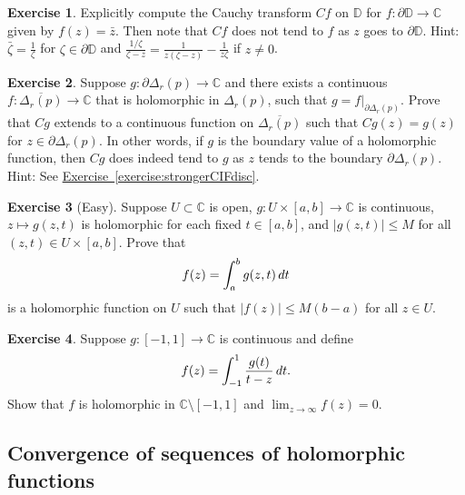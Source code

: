 \documentclass[12pt,openany]{book}
\newcommand{\avoidbreak}{\postdisplaypenalty=100}
\newcommand{\sabs}[1]{\lvert {#1} \rvert}
\newcommand{\C}{{\mathbb{C}}}
\newcommand{\D}{{\mathbb{D}}}
\theoremstyle{plain}
\theoremstyle{remark}
\theoremstyle{definition}
\newenvironment{exbox}{%
    \def\FrameCommand{\vrule width 1pt \relax\hspace{10pt}}%
    \MakeFramed{\advance\hsize-\width\FrameRestore}%
}{%
    \endMakeFramed
}
\theoremstyle{exercise}
\newtheorem{exercise}{Exercise}[section]
\theoremstyle{example}
\newcommand{\exerciseref}[1]{\hyperref[#1]{Exercise~\ref*{#1}}}
\begin{document}
\begin{exbox}
\begin{exercise}
Explicitly compute
the Cauchy transform $Cf$ on $\D$ for $f \colon \partial \D \to \C$
given by $f(z) = \bar{z}$.  Then note that $Cf$ does not tend to $f$
as $z$ goes to $\partial \D$.
Hint: $\bar{\zeta} = \frac{1}{\zeta}$ for
$\zeta \in \partial \D$
and $\frac{1/\zeta}{\zeta-z} = \frac{1}{z(\zeta-z)} - \frac{1}{z \zeta}$
if $z \neq 0$.
\end{exercise}

\begin{exercise}
Suppose $g \colon \partial \Delta_r(p) \to \C$ and
there exists a continuous
$f \colon \overline{\Delta_r(p)} \to \C$ that is
holomorphic in $\Delta_r(p)$, such that $g = f|_{\partial \Delta_r(p)}$.
Prove that $Cg$ extends to a
continuous function on $\overline{\Delta_r(p)}$ such that
$Cg(z) = g(z)$ for $z \in \partial \Delta_r(p)$.
In other words, if $g$ is
the boundary value of a holomorphic function, then $Cg$ does indeed tend to
$g$ as $z$ tends to the boundary $\partial \Delta_r(p)$.
Hint: See \exerciseref{exercise:strongerCIFdisc}.
\end{exercise}

\begin{exercise}[Easy]
Suppose $U \subset \C$ is open, $g \colon U \times [a,b] \to \C$ is continuous, 
$z\mapsto g(z,t)$ is holomorphic
for each fixed $t \in [a,b]$,
and $\sabs{g(z,t)} \leq M$ for all $(z,t) \in U \times
[a,b]$.  Prove that
\begin{equation*}
f(z) = \int_a^b g(z,t)  \, dt
\avoidbreak
\end{equation*}
is a holomorphic function on $U$
such that $\sabs{f(z)} \leq M(b-a)$ for all $z \in U$.
\end{exercise}

\begin{exercise}
Suppose $g \colon [-1,1] \to \C$ is continuous and define
\begin{equation*}
f(z) = \int_{-1}^1 \frac{g(t)}{t-z} \, dt .
\avoidbreak
\end{equation*}
Show that $f$ is holomorphic in $\C \setminus [-1,1]$ and
$\lim_{z \to \infty} f(z) = 0$.
\end{exercise}
\end{exbox}

\subsection{Convergence of sequences of holomorphic functions}
\label{subsec:convergence}
\end{document}
